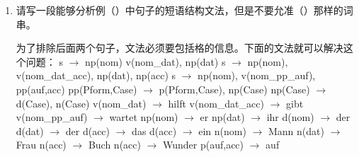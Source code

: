 \begin{enumerate}
\item 请写一段能够分析例（）中句子的短语结构文法，但是不要允准（）那样的词串。
      \eal
      \zl
      \eal
      \zl

为了排除后面两个句子，文法必须要包括格的信息。下面的文法就可以解决这个问题：
\eal
\ex s $\to$ np(nom) v(nom\_dat), np(dat)
\ex s $\to$ np(nom), v(nom\_dat\_acc), np(dat), np(acc)
\ex s $\to$ np(nom), v(nom\_pp\_auf), pp(auf,acc)
\ex pp(Pform,Case) $\to$ p(Pform,Case), np(Case)
\ex np(Case) $\to$ d(Case), n(Case)
\ex v(nom\_dat) $\to$ hilft
\ex v(nom\_dat\_acc) $\to$ gibt
\ex v(nom\_pp\_auf) $\to$ wartet
\ex np(nom) $\to$ er
\ex np(dat) $\to$ ihr
\ex d(nom) $\to$ der
\ex d(dat) $\to$ der
\ex d(acc) $\to$ das
\ex d(acc) $\to$ ein
\ex n(nom) $\to$ Mann
\ex n(dat) $\to$ Frau
\ex n(acc) $\to$ Buch
\ex n(acc) $\to$ Wunder
\ex p(auf,acc) $\to$ auf
\zl

\end{enumerate}



